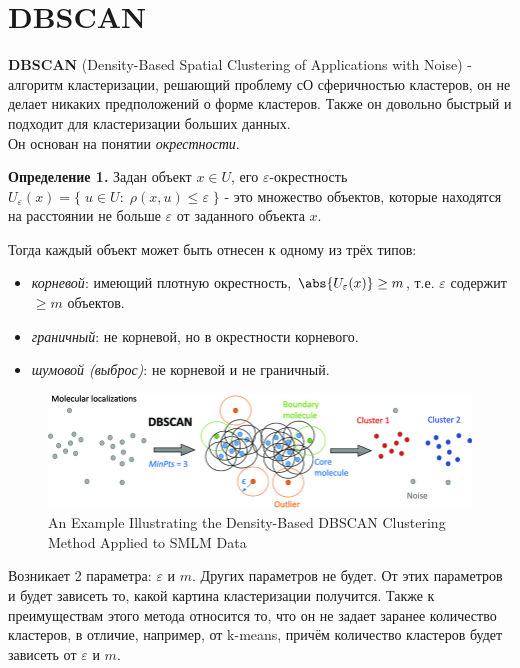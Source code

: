 \section{DBSCAN}

\textbf{DBSCAN} (Density-Based Spatial Clustering of Applications with Noise) - алгоритм кластеризации, решающий проблему сО сферичностью кластеров, он не делает никаких предположений о форме кластеров. Также он довольно быстрый и подходит для кластеризации больших данных.
\\
Он основан на понятии {\textit{окрестности}}.

\textbf{Определение 1.} Задан объект $x \in U$, его $\varepsilon$-окрестность $U_\varepsilon (x) = \{\;u\in U:\; \rho (x,u) \leq \varepsilon \;\}$ - это множество объектов, которые находятся на расстоянии не больше $\varepsilon$ от заданного объекта $x$.

Тогда каждый объект может быть отнесен к одному из трёх типов:
\begin{itemize}
    \item \textit{корневой}: имеющий плотную окрестность,  {$\abs{U_\varepsilon (x)} \geq m$}, т.е. $\varepsilon$ содержит $\geq m$ объектов.
    \item \textit{граничный}: не корневой, но в окрестности корневого.
    \item \textit{шумовой (выброс)}: не корневой и не граничный.
\end{itemize}
\begin{figure}[h!]
    \centering
    \includegraphics[width=0.9\linewidth]{png/An-Example-Illustrating-the-Density-Based-DBSCAN-Clustering-Method-Applied-to-SMLM-Data.png}
    \caption{An Example Illustrating the Density-Based DBSCAN Clustering Method Applied to SMLM Data}
    \label{fig:enter-label}
\end{figure}
Возникает 2 параметра: $\varepsilon$ и $m$. Других параметров не будет. От этих параметров и будет зависеть то, какой картина кластеризации получится. Также к преимуществам этого метода относится то, что он не задает заранее количество кластеров, в отличие, например, от k-means, причём количество кластеров будет зависеть от $\varepsilon$ и $m$. 

